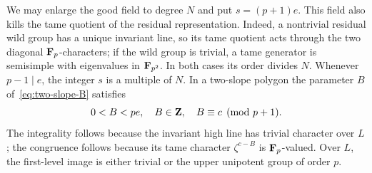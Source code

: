We may enlarge the good field to degree $N$ and put $s=(p+1)e$. This field also kills the tame quotient of the residual representation. Indeed, a nontrivial residual wild group has a unique invariant line, so its tame quotient acts through the two diagonal $\mathbf F_p$-characters; if the wild group is trivial, a tame generator is semisimple with eigenvalues in $\mathbf F_{p^2}$. In both cases its order divides $N$. Whenever $p-1\mid e$, the integer $s$ is a multiple of $N$. In a two-slope polygon the parameter $B$ of~\eqref{eq:two-slope-B} satisfies
\[
           0<B<pe,\quad B\in\mathbf Z,\quad B\equiv c\pmod{p+1}.
\]
The integrality follows because the invariant high line has trivial character over $L$; the congruence follows because its tame character $\zeta^{c-B}$ is $\mathbf F_p$-valued. Over $L$, the first-level image is either trivial or the upper unipotent group of order $p$.

